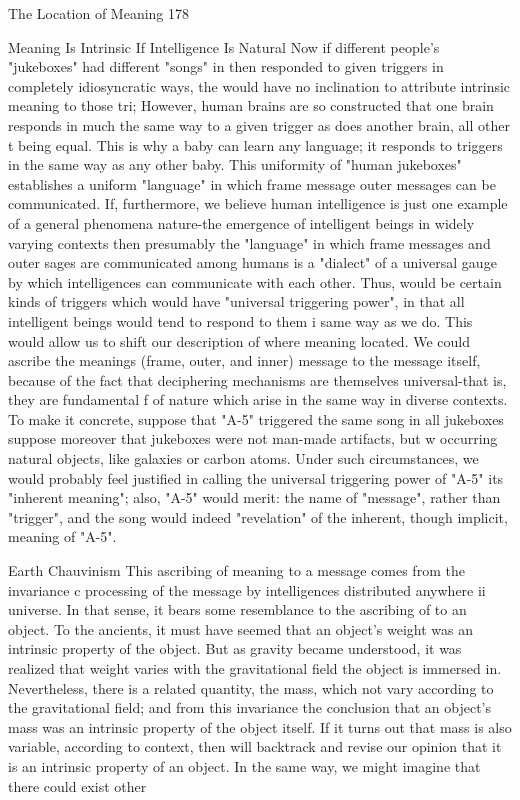 The Location of Meaning                                                                  178

                 Meaning Is Intrinsic If Intelligence Is Natural
Now if different people's "jukeboxes" had different "songs" in then responded to given
triggers in completely idiosyncratic ways, the would have no inclination to attribute
intrinsic meaning to those tri; However, human brains are so constructed that one brain
responds in much the same way to a given trigger as does another brain, all other t being
equal. This is why a baby can learn any language; it responds to triggers in the same way
as any other baby. This uniformity of "human jukeboxes" establishes a uniform
"language" in which frame message outer messages can be communicated. If,
furthermore, we believe human intelligence is just one example of a general phenomena
nature-the emergence of intelligent beings in widely varying contexts then presumably
the "language" in which frame messages and outer sages are communicated among
humans is a "dialect" of a universal gauge by which intelligences can communicate with
each other. Thus, would be certain kinds of triggers which would have "universal
triggering power", in that all intelligent beings would tend to respond to them i same way
as we do.
        This would allow us to shift our description of where meaning located. We could
ascribe the meanings (frame, outer, and inner) message to the message itself, because of
the fact that deciphering mechanisms are themselves universal-that is, they are
fundamental f of nature which arise in the same way in diverse contexts. To make it
concrete, suppose that "A-5" triggered the same song in all jukeboxes suppose moreover
that jukeboxes were not man-made artifacts, but w occurring natural objects, like galaxies
or carbon atoms. Under such circumstances, we would probably feel justified in calling
the universal triggering power of "A-5" its "inherent meaning"; also, "A-5" would merit:
the name of "message", rather than "trigger", and the song would indeed "revelation" of
the inherent, though implicit, meaning of "A-5".

                                    Earth Chauvinism
This ascribing of meaning to a message comes from the invariance c processing of the
message by intelligences distributed anywhere ii universe. In that sense, it bears some
resemblance to the ascribing of to an object. To the ancients, it must have seemed that an
object's weight was an intrinsic property of the object. But as gravity became understood,
it was realized that weight varies with the gravitational field the object is immersed in.
Nevertheless, there is a related quantity, the mass, which not vary according to the
gravitational field; and from this invariance the conclusion that an object's mass was an
intrinsic property of the object itself. If it turns out that mass is also variable, according to
context, then will backtrack and revise our opinion that it is an intrinsic property of an
object. In the same way, we might imagine that there could exist other




